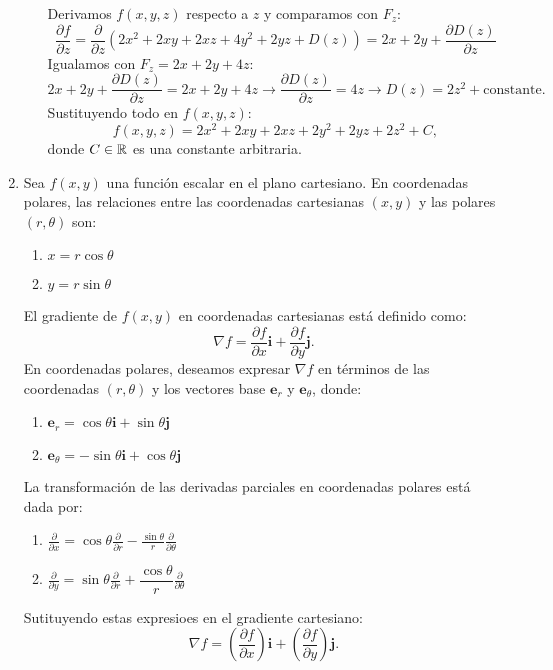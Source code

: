 \begin{enumerate}[label=\color{red}\textbf{\arabic*)}]
\begin{enumerate}[label=\color{red}\textbf{\alph*)}]
      Derivamos  $f(x,y,z)$ respecto a  $z$ y comparamos con  $F_z$:
       \[
         \frac{\partial f}{\partial z} =\frac{\partial }{\partial z}\left( 2x^2+2xy+2xz+4y^2+2yz+D(z) \right) =2x+2y+\frac{\partial D(z)}{\partial z} 
      \] 
      Igualamos con $F_z=2x+2y+4z$:  \[
      2x+2y+\frac{\partial D(z)}{\partial z}=2x+2y+4z\longrightarrow \frac{\partial D(z)}{\partial z} =4z\longrightarrow D(z)=2z^2+\text{constante}. 
      \] 
      Sustituyendo todo en $f(x,y,z)$:  \[
      f(x,y,z)=2x^2+2xy+2xz+2y^2+2yz+2z^2+C,
      \] 
      donde $C\in \operatorname{\mathbb{R}}$ es una constante arbitraria.
  \end{enumerate}
\item {}

  Sea $f(x,y)$ una función escalar en el plano cartesiano. En coordenadas polares, las relaciones entre las coordenadas cartesianas  $(x,y)$ y las polares  $(r,\theta)$ son:
  \begin{enumerate}[label=\arabic*)]
    \item $x=r\cos\theta$
    \item $y=r\sin\theta$
  \end{enumerate}
  El gradiente de $f(x,y)$ en coordenadas cartesianas está definido como:  \[
  \nabla f=\frac{\partial f}{\partial x} \mathbf{i} +\frac{\partial f}{\partial y} \mathbf{j} .
  \] 
  En coordenadas polares, deseamos expresar $\nabla f$ en términos de las coordenadas $(r,\theta)$ y los vectores base $\mathbf{e}_r$ y $\mathbf{e}_\theta$, donde:
  \begin{enumerate}[label=\arabic*)]
    \item $\mathbf{e}_r=\cos\theta\mathbf{i} +\sin\theta\mathbf{j} $
    \item $\mathbf{e}_\theta=-\sin\theta\mathbf{i} +\cos\theta\mathbf{j} $
  \end{enumerate}
  La transformación de las derivadas parciales en coordenadas polares está dada por:
  \begin{enumerate}[label=\arabic*)]
    \item $\frac{\partial }{\partial x} =\cos\theta \frac{\partial }{\partial r} -\frac{\sin\theta}{r}\frac{\partial }{\partial \theta} $ 
    \item $\frac{\partial }{\partial y} =\sin\theta \frac{\partial }{\partial r} +\dfrac{\cos\theta}{r}\frac{\partial }{\partial \theta} $
  \end{enumerate}
  Sutituyendo estas expresioes en el gradiente cartesiano: \[
  \nabla f=\left( \frac{\partial f}{\partial x}  \right) \mathbf{i} +\left( \frac{\partial f}{\partial y}  \right) \mathbf{j} .
\]
\end{enumerate}
